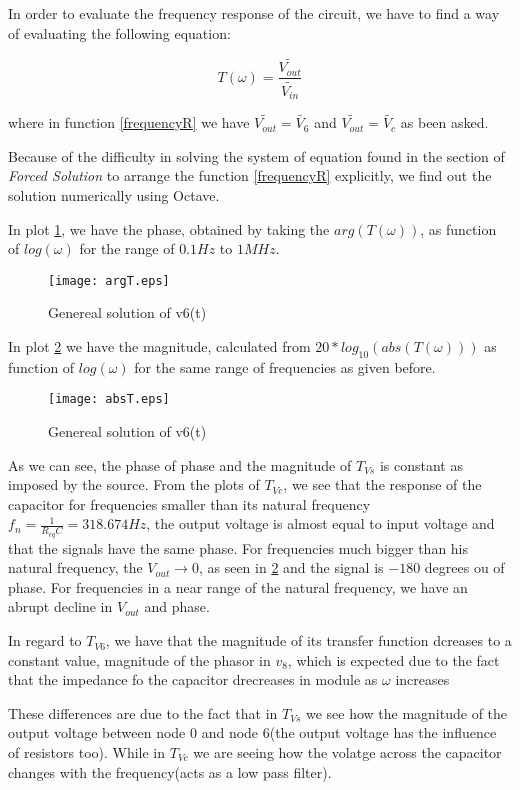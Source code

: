 In order to evaluate the frequency response of the circuit, we have to find a way of evaluating the following equation:

\begin{equation}
  T(\omega) = \frac{\widetilde{V_{out}}}{\widetilde{V_{in}}}
  \label{frequencyR}
\end{equation}

where in function \ref{frequencyR} we have $\widetilde{V_{out}} = \tilde{V_6}$ and $\widetilde{V_{out}} = \tilde{V_c}$ as been asked.

Because of the difficulty in solving the system of equation found in the section of \textit{Forced Solution} to arrange the function \ref{frequencyR} explicitly, we find out the solution numerically using Octave.

In plot \ref{fig:argT}, we have the phase, obtained by taking the $arg(T(\omega))$, as function of $log(\omega)$ for the range of $0.1Hz$ to $1MHz$.

\begin{figure}[h] \centering
  \texttt{[image: argT.eps]}
  \caption{Genereal solution of v6(t)}
  \label{fig:argT}
\end{figure}

In plot \ref{fig:absT} we have the magnitude, calculated from $20*log_{10}(abs(T(\omega)))$ as function of $log(\omega)$ for the same range of frequencies as given before.

\begin{figure}[h] \centering
  \texttt{[image: absT.eps]}
  \caption{Genereal solution of v6(t)}
  \label{fig:absT}
\end{figure}


As we can see, the phase of phase and the magnitude of $T_{Vs}$ is constant as imposed by the source.
From the plots of $T_{Vc}$, we see that the response of the capacitor for frequencies smaller than its natural frequency $f_n = \frac{1}{R_{eq}C} = 318.674 Hz$, the output voltage is almost equal to input voltage and that the signals have the same phase.
For frequencies much bigger than his natural frequency, the $V_{out} \rightarrow 0$, as seen  in \ref{fig:absT} and the signal is $-180$ degrees ou of phase.
For frequencies in a near range of the natural frequency, we have an abrupt decline in $V_{out}$ and phase.

In regard to $T_{V6}$, we have that the magnitude of its transfer function dcreases to a constant value, magnitude of the phasor in $v_8$, which is expected due to the fact that the impedance fo the capacitor drecreases in module as $\omega$ increases



These differences are due to the fact that in $T_{Vs}$ we see how the magnitude of the output voltage between node 0 and node 6(the output voltage has the influence of resistors too). While in
$T_{Vc}$ we are seeing how the volatge across the capacitor changes with the frequency(acts as a low pass filter).